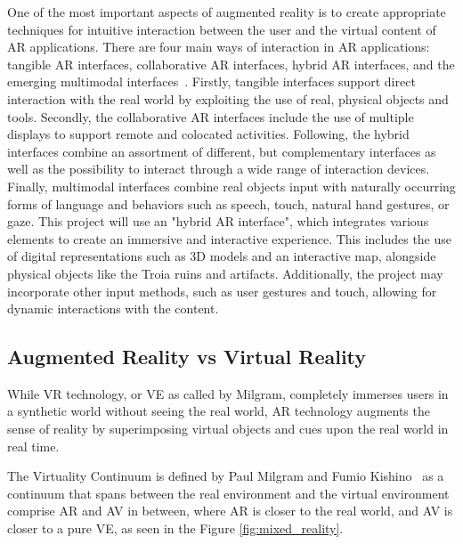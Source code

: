 One of the most important aspects of augmented reality is to create appropriate techniques
for intuitive interaction between the user and the virtual content of \gls{AR} applications. There
are four main ways of interaction in \gls{AR} applications: tangible \gls{AR} interfaces, collaborative
\gls{AR} interfaces, hybrid \gls{AR} interfaces, and the emerging multimodal interfaces~\cite{carmigniani2011augmented}.
Firstly, tangible interfaces support direct interaction with the real world by exploiting the use of
real, physical objects and tools. Secondly, the collaborative \gls{AR} interfaces include the use of multiple displays to support remote and colocated activities.
Following, the hybrid interfaces combine an assortment of different, but complementary interfaces as well
as the possibility to interact through a wide range of interaction devices.
Finally, multimodal interfaces combine real objects input with naturally occurring forms of language
and behaviors such as speech, touch, natural hand gestures, or gaze. This project will use an "hybrid \gls{AR} interface", which integrates various elements to create an immersive and interactive experience.
This includes the use of digital representations such as \gls{3D} models and an interactive map, alongside physical objects like the Troia ruins and artifacts.
Additionally, the project may incorporate other input methods, such as user gestures and touch, allowing for dynamic interactions with the content. 


\subsection{Augmented Reality vs Virtual Reality}
\label{sec:mix_reality}

While \gls{VR} technology, or \gls{VE} as called by Milgram, completely immerses users in a synthetic world
without seeing the real world, \gls{AR} technology augments the sense of reality by superimposing virtual objects and cues upon the real world in real time. 

The Virtuality Continuum is defined by Paul Milgram and Fumio Kishino~\cite{milgram1994taxonomy} as a continuum that spans between the real environment
and the virtual environment comprise \gls{AR} and \gls{AV}
in between, where \gls{AR} is closer to the real world, and \gls{AV} is closer to a pure \gls{VE}, as seen in the Figure \ref{fig:mixed_reality}.

